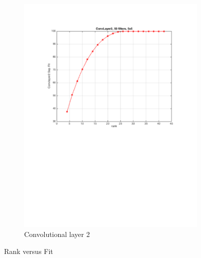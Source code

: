 \begin{figure}[h]
\begin{subfigure}[b]{0.40\textwidth}
    \includegraphics[width=\textwidth]{images/imagesCNN_page2.pdf}
    \caption{Convolutional layer 2}
  \end{subfigure}
  \caption{Rank versus Fit}
  \label{fig:cnn1fitness}
\end{figure}

